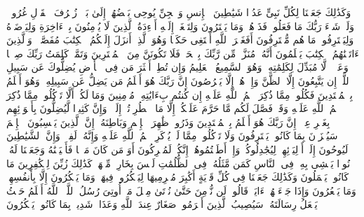 \startbuffer[\q:6:112]
وَكَذَٰلِكَ جَعَلۡنَا لِكُلِّ نَبِیٍّ عَدُوࣰّا شَیَٰطِینَ ٱلۡإِنسِ وَٱلۡجِنِّ یُوحِی بَعۡضُهُمۡ إِلَىٰ بَعۡضࣲ زُخۡرُفَ ٱلۡقَوۡلِ غُرُورࣰاۚ وَلَوۡ شَاۤءَ رَبُّكَ مَا فَعَلُوهُۖ فَذَرۡهُمۡ وَمَا یَفۡتَرُونَ%
\stopbuffer%
\startbuffer[\q:6:113]
وَلِتَصۡغَىٰۤ إِلَیۡهِ أَفۡءِدَةُ ٱلَّذِینَ لَا یُؤۡمِنُونَ بِٱلۡءَاخِرَةِ وَلِیَرۡضَوۡهُ وَلِیَقۡتَرِفُوا۟ مَا هُم مُّقۡتَرِفُونَ%
\stopbuffer%
\startbuffer[\q:6:114]
أَفَغَیۡرَ ٱللَّهِ أَبۡتَغِی حَكَمࣰا وَهُوَ ٱلَّذِیۤ أَنزَلَ إِلَیۡكُمُ ٱلۡكِتَٰبَ مُفَصَّلࣰاۚ وَٱلَّذِینَ ءَاتَیۡنَٰهُمُ ٱلۡكِتَٰبَ یَعۡلَمُونَ أَنَّهُۥ مُنَزَّلࣱ مِّن رَّبِّكَ بِٱلۡحَقِّۖ فَلَا تَكُونَنَّ مِنَ ٱلۡمُمۡتَرِینَ%
\stopbuffer%
\startbuffer[\q:6:115]
وَتَمَّتۡ كَلِمَتُ رَبِّكَ صِدۡقࣰا وَعَدۡلࣰاۚ لَّا مُبَدِّلَ لِكَلِمَٰتِهِۦۚ وَهُوَ ٱلسَّمِیعُ ٱلۡعَلِیمُ%
\stopbuffer%
\startbuffer[\q:6:116]
وَإِن تُطِعۡ أَكۡثَرَ مَن فِی ٱلۡأَرۡضِ یُضِلُّوكَ عَن سَبِیلِ ٱللَّهِۚ إِن یَتَّبِعُونَ إِلَّا ٱلظَّنَّ وَإِنۡ هُمۡ إِلَّا یَخۡرُصُونَ%
\stopbuffer%
\startbuffer[\q:6:117]
إِنَّ رَبَّكَ هُوَ أَعۡلَمُ مَن یَضِلُّ عَن سَبِیلِهِۦۖ وَهُوَ أَعۡلَمُ بِٱلۡمُهۡتَدِینَ%
\stopbuffer%
\startbuffer[\q:6:118]
فَكُلُوا۟ مِمَّا ذُكِرَ ٱسۡمُ ٱللَّهِ عَلَیۡهِ إِن كُنتُم بِءَایَٰتِهِۦ مُؤۡمِنِینَ%
\stopbuffer%
\startbuffer[\q:6:119]
وَمَا لَكُمۡ أَلَّا تَأۡكُلُوا۟ مِمَّا ذُكِرَ ٱسۡمُ ٱللَّهِ عَلَیۡهِ وَقَدۡ فَصَّلَ لَكُم مَّا حَرَّمَ عَلَیۡكُمۡ إِلَّا مَا ٱضۡطُرِرۡتُمۡ إِلَیۡهِۗ وَإِنَّ كَثِیرࣰا لَّیُضِلُّونَ بِأَهۡوَاۤئِهِم بِغَیۡرِ عِلۡمٍۚ إِنَّ رَبَّكَ هُوَ أَعۡلَمُ بِٱلۡمُعۡتَدِینَ%
\stopbuffer%
\startbuffer[\q:6:120]
وَذَرُوا۟ ظَٰهِرَ ٱلۡإِثۡمِ وَبَاطِنَهُۥۤۚ إِنَّ ٱلَّذِینَ یَكۡسِبُونَ ٱلۡإِثۡمَ سَیُجۡزَوۡنَ بِمَا كَانُوا۟ یَقۡتَرِفُونَ%
\stopbuffer%
\startbuffer[\q:6:121]
وَلَا تَأۡكُلُوا۟ مِمَّا لَمۡ یُذۡكَرِ ٱسۡمُ ٱللَّهِ عَلَیۡهِ وَإِنَّهُۥ لَفِسۡقࣱۗ وَإِنَّ ٱلشَّیَٰطِینَ لَیُوحُونَ إِلَىٰۤ أَوۡلِیَاۤئِهِمۡ لِیُجَٰدِلُوكُمۡۖ وَإِنۡ أَطَعۡتُمُوهُمۡ إِنَّكُمۡ لَمُشۡرِكُونَ%
\stopbuffer%
\startbuffer[\q:6:122]
أَوَ مَن كَانَ مَیۡتࣰا فَأَحۡیَیۡنَٰهُ وَجَعَلۡنَا لَهُۥ نُورࣰا یَمۡشِی بِهِۦ فِی ٱلنَّاسِ كَمَن مَّثَلُهُۥ فِی ٱلظُّلُمَٰتِ لَیۡسَ بِخَارِجࣲ مِّنۡهَاۚ كَذَٰلِكَ زُیِّنَ لِلۡكَٰفِرِینَ مَا كَانُوا۟ یَعۡمَلُونَ%
\stopbuffer%
\startbuffer[\q:6:123]
وَكَذَٰلِكَ جَعَلۡنَا فِی كُلِّ قَرۡیَةٍ أَكَٰبِرَ مُجۡرِمِیهَا لِیَمۡكُرُوا۟ فِیهَاۖ وَمَا یَمۡكُرُونَ إِلَّا بِأَنفُسِهِمۡ وَمَا یَشۡعُرُونَ%
\stopbuffer%
\startbuffer[\q:6:124]
وَإِذَا جَاۤءَتۡهُمۡ ءَایَةࣱ قَالُوا۟ لَن نُّؤۡمِنَ حَتَّىٰ نُؤۡتَىٰ مِثۡلَ مَاۤ أُوتِیَ رُسُلُ ٱللَّهِۘ ٱللَّهُ أَعۡلَمُ حَیۡثُ یَجۡعَلُ رِسَالَتَهُۥۗ سَیُصِیبُ ٱلَّذِینَ أَجۡرَمُوا۟ صَغَارٌ عِندَ ٱللَّهِ وَعَذَابࣱ شَدِیدُۢ بِمَا كَانُوا۟ یَمۡكُرُونَ%
